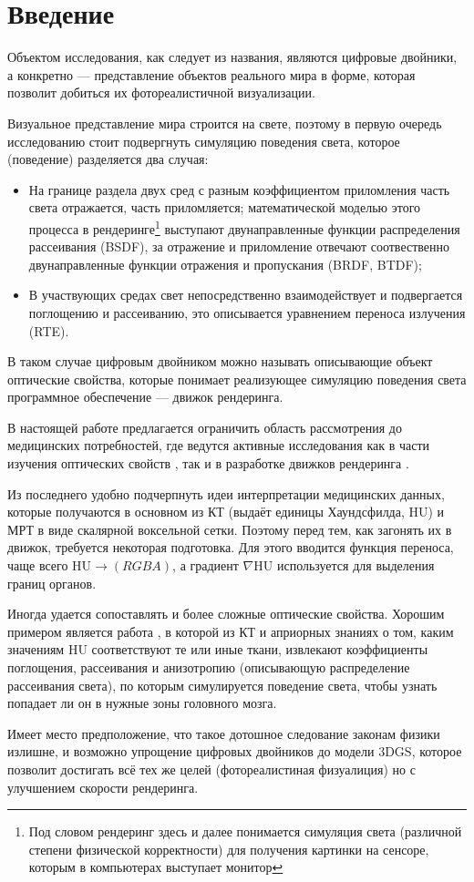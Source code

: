 \section*{Введение}

Объектом исследования, как следует из названия, являются цифровые двойники, а конкретно --- представление объектов реального мира в форме, которая позволит добиться их фотореалистичной визуализации.

Визуальное представление мира строится на свете, поэтому в первую очередь исследованию стоит подвергнуть симуляцию поведения света, которое (поведение) разделяется два случая:
\begin{itemize}
	\item На границе раздела двух сред с разным коэффициентом приломления часть света отражается, часть приломляется; математической моделью этого процесса в рендеринге\footnote{Под словом рендеринг здесь и далее понимается симуляция света (различной степени физической корректности) для получения картинки на сенсоре, которым в компьютерах выступает монитор} выступают двунаправленные функции распределения рассеивания (BSDF), за отражение и приломление отвечают соотвественно двунаправленные функции отражения и пропускания (BRDF, BTDF);
	\item В участвующих средах свет непосредственно взаимодействует и подвергается поглощению и рассеиванию, это описывается уравнением переноса излучения (RTE).
\end{itemize}

В таком случае цифровым двойником можно называть описывающие объект оптические свойства, которые понимает реализующее симуляцию поведения света программное обеспечение --- движок рендеринга.

В настоящей работе предлагается ограничить область рассмотрения до медицинских потребностей, где ведутся активные исследования как в части изучения оптических свойств \cite{Jacques_2013}, так и в разработке движков рендеринга \cite{kroes2012exposure}.

Из последнего удобно подчерпнуть идеи интерпретации медицинских данных, которые получаются в основном из КТ (выдаёт единицы Хаундсфилда, HU) и МРТ в виде скалярной воксельной сетки. Поэтому перед тем, как загонять их в движок, требуется некоторая подготовка. Для этого вводится функция переноса, чаще всего $\mathrm{HU} \to (RGBA)$, а градиент $\nabla\mathrm{HU}$ используется для выделения границ органов.

Иногда удается сопоставлять и более сложные оптические свойства. Хорошим примером является работа \cite{verleker2014optical}, в которой из КТ и априорных знаниях о том, каким значениям HU соответствуют те или иные ткани, извлекают коэффициенты поглощения, рассеивания и анизотропию (описывающую распределение рассеивания света), по которым симулируется поведение света, чтобы узнать попадает ли он в нужные зоны головного мозга.

Имеет место предположение, что такое дотошное следование законам физики излишне, и возможно упрощение цифровых двойников до модели 3DGS, которое позволит достигать всё тех же целей (фотореалистиная физуалиция) но с улучшением скорости рендеринга.